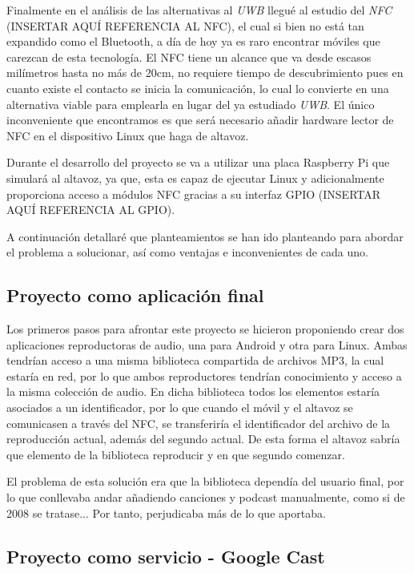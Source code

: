Finalmente en el análisis de las alternativas al \emph{UWB} llegué al estudio
del \emph{NFC} (INSERTAR AQUÍ REFERENCIA AL NFC), el cual si bien no está tan
expandido como el Bluetooth, a día de hoy ya es raro encontrar móviles que
carezcan de esta tecnología. El NFC tiene un alcance que va desde escasos
milímetros hasta no más de 20cm, no requiere tiempo de descubrimiento pues en
cuanto existe el contacto se inicia la comunicación, lo cual lo convierte en una
alternativa viable para emplearla en lugar del ya estudiado \emph{UWB}. El único
inconveniente que encontramos es que será necesario añadir hardware lector de
NFC en el dispositivo Linux que haga de altavoz.

Durante el desarrollo del proyecto se va a utilizar una placa Raspberry Pi que
simulará al altavoz, ya que, esta es capaz de ejecutar Linux y adicionalmente
proporciona acceso a módulos NFC gracias a su interfaz GPIO (INSERTAR AQUÍ
REFERENCIA AL GPIO).

A continuación detallaré que planteamientos se han ido planteando para abordar el
problema a solucionar, así como ventajas e inconvenientes de cada uno.

\subsection{Proyecto como aplicación final}

Los primeros pasos para afrontar este proyecto se hicieron proponiendo crear dos
aplicaciones reproductoras de audio, una para Android y otra para Linux. Ambas
tendrían acceso a una misma biblioteca compartida de archivos MP3, la cual
estaría en red, por lo que ambos reproductores tendrían conocimiento y acceso a
la misma colección de audio. En dicha biblioteca todos los elementos estaría
asociados a un identificador, por lo que cuando el móvil y el altavoz se
comunicasen a través del NFC, se transferiría el identificador del archivo de la
reproducción actual, además del segundo actual. De esta forma el altavoz sabría
que elemento de la biblioteca reproducir y en que segundo comenzar.

El problema de esta solución era que la biblioteca dependía del usuario final,
por lo que conllevaba andar añadiendo canciones y podcast manualmente, como si
de 2008 se tratase... Por tanto, perjudicaba más de lo que aportaba.

\subsection{Proyecto como servicio - Google Cast}

